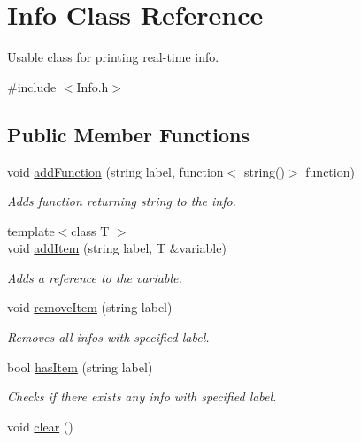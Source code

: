 \hypertarget{classInfo}{}\section{Info Class Reference}
\label{classInfo}


Usable class for printing real-\/time info.  




{\ttfamily \#include $<$Info.\+h$>$}

\subsection*{Public Member Functions}
\begin{DoxyCompactItemize}
\item 
void \hyperlink{classInfo_a1510c6fef726231c8e6206ad6fe8e54a}{add\+Function} (string label, function$<$ string()$>$ function)
\begin{DoxyCompactList}\small\item\em Adds function returning string to the info. \end{DoxyCompactList}\item 
{\footnotesize template$<$class T $>$ }\\void \hyperlink{classInfo_a19d28f3de1bd231f261097ce2a0aebd6}{add\+Item} (string label, T \&variable)
\begin{DoxyCompactList}\small\item\em Adds a reference to the variable. \end{DoxyCompactList}\item 
void \hyperlink{classInfo_af720d655559a164398971ef7f42feb22}{remove\+Item} (string label)
\begin{DoxyCompactList}\small\item\em Removes all infos with specified label. \end{DoxyCompactList}\item 
bool \hyperlink{classInfo_afaace7a1302cd4b4d2ef292a851cab4d}{has\+Item} (string label)
\begin{DoxyCompactList}\small\item\em Checks if there exists any info with specified label. \end{DoxyCompactList}\item 
void \hyperlink{classInfo_a57d227fdc9818b6079f7f4fa9cbcc47e}{clear} ()\hypertarget{classInfo_a57d227fdc9818b6079f7f4fa9cbcc47e}{}\label{classInfo_a57d227fdc9818b6079f7f4fa9cbcc47e}


\end{DoxyCompactItemize}
